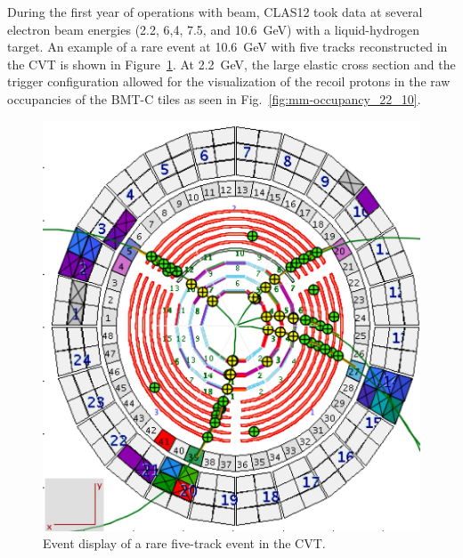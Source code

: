 During the first year of operations with beam, CLAS12 took data at several electron beam energies (2.2, 6,4, 7.5, and 10.6~GeV)
with a liquid-hydrogen target. An example of a rare event at 10.6~GeV with five tracks reconstructed in the CVT is 
shown in Figure~\ref{fig:cd-tracks}. At 2.2~GeV, the large elastic cross section and the trigger configuration allowed 
for the visualization of the recoil protons in the raw occupancies of the BMT-C tiles as seen in 
Fig.~\ref{fig:mm-occupancy_22_10}. 

\begin{figure}[htb]
 \includegraphics[width=.9\columnwidth]{images/cd-tracks}
 \caption{Event display of a rare five-track event in the CVT.}
 \label{fig:cd-tracks}
\end{figure}


